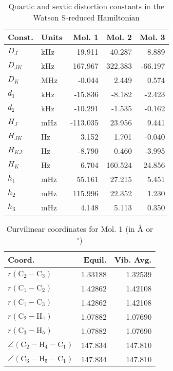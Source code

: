 \begin{table}
\centering
\caption{Quartic and sextic distortion constants in the Watson S-reduced Hamiltonian}
\begin{tabular}{llrrr}
Const.        & Units    &     Mol. 1 &     Mol. 2 &     Mol. 3 \\
\hline
$D_{J}$       & kHz      &     19.911 &     40.287 &      8.889 \\
$D_{JK}$      & kHz      &    167.967 &    322.383 &    -66.197 \\
$D_{K}$       & MHz      &     -0.044 &      2.449 &      0.574 \\
$d_{1}$       & kHz      &    -15.836 &     -8.182 &     -2.423 \\
$d_{2}$       & kHz      &    -10.291 &     -1.535 &     -0.162 \\
\hline
$H_{J}$       & mHz      &   -113.035 &     23.956 &      9.441 \\
$H_{JK}$      & Hz       &      3.152 &      1.701 &     -0.040 \\
$H_{KJ}$      & Hz       &     -8.790 &      0.460 &     -3.995 \\
$H_{K}$       & Hz       &      6.704 &    160.524 &     24.856 \\
$h_{1}$       & mHz      &     55.161 &     27.215 &      5.451 \\
$h_{2}$       & mHz      &    115.996 &     22.352 &      1.230 \\
$h_{3}$       & mHz      &      4.148 &      5.113 &      0.350 \\
\end{tabular}
\end{table}

\begin{table}
\centering
\caption{Curvilinear coordinates for Mol. 1 (in \AA{} or $^\circ$)}
\begin{tabular}{lrr}
       Coord.         &             Equil. &          Vib. Avg. \\
\hline
$r(\text{C}_{2} - \text{C}_{3})$ &            1.33188 &            1.32539 \\
$r(\text{C}_{1} - \text{C}_{2})$ &            1.42862 &            1.42108 \\
$r(\text{C}_{1} - \text{C}_{3})$ &            1.42862 &            1.42108 \\
$r(\text{C}_{2} - \text{H}_{4})$ &            1.07882 &            1.07690 \\
$r(\text{C}_{3} - \text{H}_{5})$ &            1.07882 &            1.07690 \\
$\angle(\text{C}_{2} - \text{H}_{4} - \text{C}_{1})$ &            147.834 &            147.810 \\
$\angle(\text{C}_{3} - \text{H}_{5} - \text{C}_{1})$ &            147.834 &            147.810 \\
\end{tabular}
\end{table}

